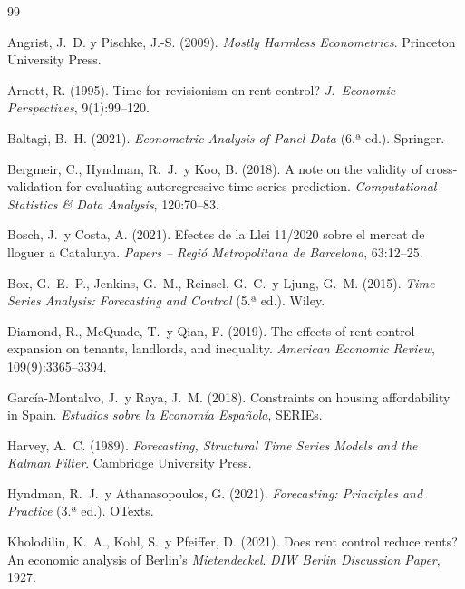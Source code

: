 \documentclass[10pt,a4paper,twocolumn]{article}
\begin{document}

\begin{thebibliography}{99}

Angrist, J.~D. y Pischke, J.-S. (2009).
\textit{Mostly Harmless Econometrics}.
Princeton University Press.

Arnott, R. (1995).
Time for revisionism on rent control?
\textit{J.\ Economic Perspectives}, 9(1):99--120.

Baltagi, B.~H. (2021).
\textit{Econometric Analysis of Panel Data} (6.ª ed.).
Springer.

Bergmeir, C., Hyndman, R.~J.\ y Koo, B. (2018).
A note on the validity of cross-validation for evaluating autoregressive time
series prediction.
\textit{Computational Statistics \& Data Analysis}, 120:70--83.

Bosch, J.\ y Costa, A. (2021).
Efectes de la Llei 11/2020 sobre el mercat de lloguer a Catalunya.
\textit{Papers -- Regió Metropolitana de Barcelona}, 63:12--25.

Box, G.~E.~P., Jenkins, G.~M., Reinsel, G.~C.\ y Ljung, G.~M. (2015).
\textit{Time Series Analysis: Forecasting and Control} (5.ª ed.).
Wiley.

Diamond, R., McQuade, T.\ y Qian, F. (2019).
The effects of rent control expansion on tenants, landlords, and inequality.
\textit{American Economic Review}, 109(9):3365--3394.

García-Montalvo, J.\ y Raya, J.~M. (2018).
Constraints on housing affordability in Spain.
\textit{Estudios sobre la Economía Española}, SERIEs.

Harvey, A.~C. (1989).
\textit{Forecasting, Structural Time Series Models and the Kalman Filter}.
Cambridge University Press.

Hyndman, R.~J.\ y Athanasopoulos, G. (2021).
\textit{Forecasting: Principles and Practice} (3.ª ed.).
OTexts.

Kholodilin, K.~A., Kohl, S.\ y Pfeiffer, D. (2021).
Does rent control reduce rents? An economic analysis of Berlin's
  \textit{Mietendeckel}.
\textit{DIW Berlin Discussion Paper}, 1927.


\end{thebibliography}
\end{document}
